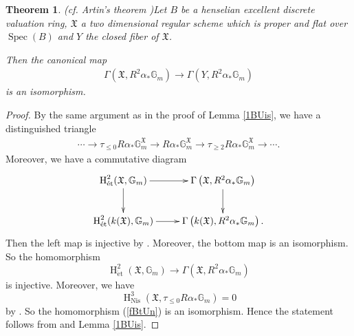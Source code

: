 \documentclass{article}
\newtheorem{thm}{\indent \sc Theorem}[section]
\newcommand{\spec}{\operatorname{Spec}}
\newcommand{\et}{\mathrm{\acute{e}t}}
\newcommand{\Nis}{\mathrm{Nis}}
\newcommand{\HO}{\operatorname{H}}
\begin{document}
%
\begin{thm}\upshape(cf. Artin's theorem \cite[p.98, Th\'{e}or\`{e}me (3.1)]{Gr})\label{BrAr}
Let $B$ be a henselian excellent discrete valuation ring,
$\mathfrak{X}$ a two dimensional regular scheme which is proper and flat over 
$\spec(B)$ and $Y$ the closed fiber of $\mathfrak{X}$. 

Then the canonical map
%
\begin{align*}
\Gamma\left(
\mathfrak{X}, 
R^{2}\alpha_{*}\mathbb{G}_{m}
\right)
\to
\Gamma\left(
Y,
R^{2}\alpha_{*}\mathbb{G}_{m}
\right)
\end{align*}
%
is an isomorphism. 
\end{thm}
%

\begin{proof}\upshape
By the same argument as in the proof of Lemma \ref{1BUis}, we have a distinguished triangle 
%
\begin{align*}
\cdots 
\to
\tau_{\leq 0}R\alpha_{*}\mathbb{G}_{m}^{\mathfrak{X}}
\to
R\alpha_{*}\mathbb{G}_{m}^{\mathfrak{X}}
\to
\tau_{\geq 2}R\alpha_{*}\mathbb{G}_{m}^{\mathfrak{X}}
\to\cdots.
\end{align*}
%
Moreover, we have a commutative diagram
%
\begin{equation*}
\xymatrix{
\HO^{2}_{\et}(
\mathfrak{X},
\mathbb{G}_{m}
)
\ar[r]\ar[d]
&
\Gamma\left(
\mathfrak{X},
R^{2}\alpha_{*}
\mathbb{G}_{m}
\right)
\ar[d]
\\
\HO^{2}_{\et}(
k(\mathfrak{X}),
\mathbb{G}_{m}
)
\ar[r]
&
\Gamma\left(
k(\mathfrak{X}),
R^{2}\alpha_{*}\mathbb{G}_{m}
\right).
}    
\end{equation*}
%
Then the left map is injective by \cite[p.145, IV, Corollary 2.6]{M}. 
Moreover, the bottom map is an isomorphism. 
So the homomorphism
%
\begin{equation}\label{fBtUn}
\HO^{2}_{\et}(
\mathfrak{X},
\mathbb{G}_{m}
)    
\to
\Gamma\left(
\mathfrak{X},
R^{2}\alpha_{*}\mathbb{G}_{m}
\right)
\end{equation}
%
is injective. Moreover, we have
%
\begin{equation*}
\HO^{3}_{\Nis}(
\mathfrak{X},
\tau_{\leq 0}
R\alpha_{*}\mathbb{G}_{m}
)  
=0
\end{equation*}
%
by \cite[pp.279--280, 1.32. Theorem]{Ni}. So the homomorphism (\ref{fBtUn}) is an isomorphism. 
Hence the statement follows from \cite[p.98, Th\'{e}or\`{e}me (3.1)]{Gr} and Lemma \ref{1BUis}.
\end{proof}
%
\end{document}
